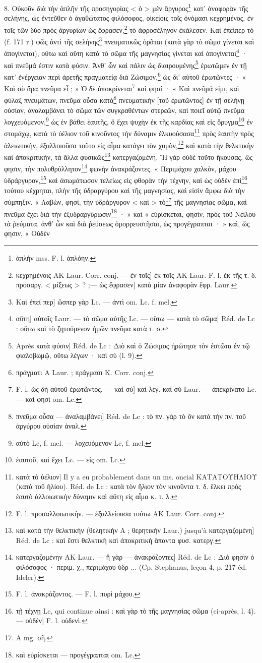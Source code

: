 \documentclass[landscape, a4paper, 11pt, oneside, polutonikogreek, french]{article}
\begin{document}
8. Οὐκοῦν διὰ τὴν ἁπλῆν τῆς προσηγορίας < ὁ > μὲν ἄργυρος\footnote{ἁπλὴν mss. F. l. ἁπλόην.} κατ' ἀναφορὰν τῆς σελήνης, ὡς ἐντεῦθεν ὁ ἀγαθώτατος φιλόσοφος, οἰκείοις τοῖς ὀνόμασι κεχρημένος, ἐν τοῖς τῶν δύο πρὸς ἀργυρίων ὡς ἔφρασεν,\footnote{κεχρημένοις AK Laur. Corr. conj. --- ἐν τοῖς] ἐκ τοῖς AK Laur. F. l. ἐκ τῆς τ. δ. προσαργ. < μίξεως > ? ;--- ὡς ἔφρασεν] κατὰ μίαν ἀναφορὰν ἔφρ. Laur.} τὸ ἀφροσέληνον ἐκάλεσεν. Καὶ ἐπείπερ τὸ (f. 171 r.) φῶς ἀντὶ τῆς σελήνης\footnote{Καὶ ἐπεί περ] ὥσπερ γὰρ Lc. --- ἀντὶ om. Lc. f. mel.} πνευματικῶς ὁρᾶται (κατὰ γὰρ τὸ σῶμα γίνεται καὶ ἀπογίνεται), οὕτω καὶ αὕτη κατὰ τὸ σῶμα τῆς μαγνησίας γίνεται καὶ ἀπογίνεται\footnote{αὕτη] αὐτοῖς Laur. --- τὸ σῶμα αὐτῆς Lc. --- οὕτω --- κατὰ τὸ σῶμα] Réd. de Lc : οὕτω καὶ τὸ ζητούμενον ἡμῶν πνεῦμα κατὰ τ. σ.} · καὶ πνεῦμά ἐστιν κατὰ φύσιν. Ἀνθ' ὧν καὶ πάλιν ὡς διαιρουμένης\footnote{Après κατὰ φύσιν] Réd. de Lc : Διὸ καὶ ὁ Ζώσιμος ἠρώτησε τὸν ἑστῶτα ἐν τῷ φιαλοβωμῷ, οὕτω λέγων · καὶ σὺ (l. 9).} ἐρωτῶμεν ἐν τῇ κατ' ἐνέργειαν περὶ ἀρετῆς πραγματείᾳ διὰ Ζώσιμον,\footnote{πράγματι A Laur. ; πράγμασι K. Corr. conj.} ὡς δι' αὐτοῦ ἐρωτῶντες · « Καὶ σὺ ἄρα πνεῦμα εἶ ; » Ὁ δὲ ἀποκρίνεται\footnote{F. l. ὡς δὴ αὐτοῦ ἐρωτῶντος. --- καὶ σὺ] καὶ λέγ. καὶ σὺ Laur. --- ἀπεκρίνατο Lc. --- καὶ φησὶ om. Lc.} καὶ φησί · « Καὶ πνεῦμά εἰμι, καὶ φύλαξ πνευμάτων, πνεῦμα οὖσα κατὰ\footnote{πνεῦμα οὖσα --- ἀναλαμβάνει] Réd. de Lc : τὸ πν. γὰρ τὸ ὂν κατὰ τὴν πν. τοῦ ἀργύρου οὐσίαν ἀναλ.} πνευματικὴν [τοῦ ἐρωτῶντος] ἐν τῇ σελήνῃ οὐσίαν, ἀναλαμβάνει τὸ σῶμα τῶν συγκραθέντων στερεῶν, καὶ ποιεῖ αὐτῷ πνεῦμα λογχευόμενον,\footnote{αὐτὸ Lc, f. mel. --- λοχευόμενον Lc, f. mel.} ὡς ἐν βάθει ἑαυτῆς, ὃ ἔχει ψυχὴν ἐκ τῆς καρδίας καὶ εἰς ὄρυγμα\footnote{ἐαυτοῦ, καὶ ἔχει Lc. --- εἰς om. Lc.} ἐν στομάχῳ, κατὰ τὸ ὑέλιον τοῦ κινοῦντος τὴν δύναμιν ἑλκυούσασα\footnote{κατὰ τὸ ὑέλιον] Il y a eu probablement dans un ms. oncial ΚΑΤΑΤΟΥΗΛΙΟΥ (κατὰ τοῦ ἡλίου). Réd. de Lc : κατὰ τὸν ἥλιον τὸν κινοῦντα τ. δ. ἕλκει πρὸς ἑαυτὸ ἀλλοιωτικὴν δύναμιν καὶ αὕτη εἰς αἷμα κ. τ. λ.} πρὸς ἑαυτὴν πρὸς ἀλειωτικὴν, ἐξαλλοιοῦσα τοῦτο εἰς αἷμα κατάγει τὸν χυμὸν,\footnote{F. l. προσαλλοιωτικὴν. --- ἐξαλλείουσα τούτω AK Laur. Corr. conj.} καὶ κατὰ τὴν θελκτικὴν καὶ ἀποκριτικὴν, τὰ ἄλλα φυσικῶς\footnote{καὶ κατὰ τὴν θελκτικὴν (θελητικὴν A ; θερητικὴν Laur.) jusqu'à κατεργαζομένη] Réd. de Lc : καὶ ἔστι θελκτικὴ καὶ ἀποκριτικὴ ἅπαντα φυσ. κατεργ.} κατεργαζομένη. Ἢ γὰρ οὐδὲ τοῦτο ἤκουσας, ὥς φησιν, τὴν πολυθρύλλητον\footnote{κατεργαζομένην AK Laur. --- ἢ γὰρ --- ἀνακράζοντες] Réd. de Lc : Διὸ φησὶν ὁ φιλόσοφος · περιμ. χ., περιμάχου ὑδρ ... (Cp. Stephanus, leçon 4, p. 217 éd. Ideler).} φωνὴν ἀνακράζοντες. « Περιμάχου χαλκὸν, μάχου ὑδράργυρον,\footnote{F. l. ἀνακράζοντος. --- F. l. πυρὶ μάχου.} καὶ ἀσωμάτωσον τελείως εἰς φθορὰν τὴν τέχνην, καὶ ὡς οὐδὲν ἐπὶ\footnote{τῇ τέχνῃ Lc, qui continue ainsi : καὶ γὰρ τὸ τῆς μαγνησίας σῶμα (ci-après, l. 4). --- οὐδὲν] F. l. οὐδενὶ.} τούτου κέχρηται, πλὴν τῆς ὑδραργύρου καὶ τῆς μαγνησίας, καὶ εἰσὶν ἄμφω διὰ τὴν σύμπηξιν. « Λαβὼν, φησὶ, τὴν ὑδράργυρον < καὶ > τὸ\footnote{A mg. σῆ.} τῆς μαγνησίας σῶμα, καὶ πνεῦμα ἔχει διὰ τὴν ἐξυδραργύρωσιν\footnote{καὶ εὑρίσκεται --- προγέγραπται om. Lc.} · » καὶ « εὑρίσκεται, φησὶν, πρὸς τοῦ Νείλου τὰ ῥεύματα, ἀνθ' ὧν καὶ διὰ ῥεύσεως ὁμορρευστῆσαι, ὡς προγέγραπται · » καὶ, ὥς φησιν, « Οὐδὲν 
\end{document}
